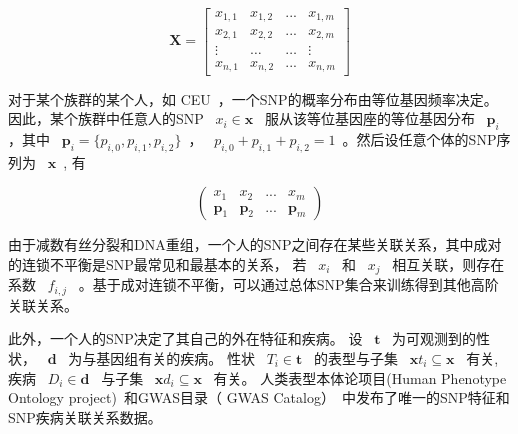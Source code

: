 \begin{equation}
\mathbf{X}=
\left[
\begin{matrix}
x_{1,1} & x_{1,2} & ...    & x_{1,m} \\
x_{2,1} & x_{2,2} & ...    & x_{2,m} \\
\vdots  & \ldots  & \ldots & \vdots  \\
x_{n,1} & x_{n,2} & ...    & x_{n,m}
\end{matrix}
\right]
\end{equation}

对于某个族群的某个人，如 CEU~\cite{auton2015a}，一个SNP的概率分布由等位基因频率决定。  因此，某个族群中任意人的SNP ~$x_i \in \mathbf{x}$~ 服从该等位基因座的等位基因分布 ~$\mathbf{p}_i$~ ，其中 ~$\mathbf{p}_i=\{p_{i,0},p_{i,1}, p_{i,2}\}$~， ~$p_{i,0}+p_{i,1}+p_{i,2}=1$~。然后设任意个体的SNP序列为 ~$\mathbf{x}$~, 有

\begin{equation}
\left(
\begin{matrix}
x_1          & x_2 & ... & x_m \\
\mathbf{p}_1 & \mathbf{p}_2 & ... & \mathbf{p}_m
\end{matrix}
\right)
\end{equation}

由于减数有丝分裂和DNA重组，一个人的SNP之间存在某些关联关系，其中成对的连锁不平衡是SNP最常见和最基本的关系， 若 ~$x_i$~ 和 ~$x_j$~ 相互关联，则存在系数 ~$f_{i,j}$~ 。基于成对连锁不平衡，可以通过总体SNP集合来训练得到其他高阶关联关系。

此外，一个人的SNP决定了其自己的外在特征和疾病。 设 ~$\mathbf{t}$~ 为可观测到的性状， ~$\mathbf{d}$~ 为与基因组有关的疾病。  性状 ~$T_i \in \mathbf{t}$~ 的表型与子集 ~$\mathbf{x}t_i \subseteq \mathbf{x}$~ 有关, 疾病 ~$D_i \in \mathbf{d}$~ 与子集 ~$\mathbf{x}d_i \subseteq \mathbf{x}$~ 有关。 人类表型本体论项目(Human Phenotype Ontology project)~\cite{koehler2014human}和GWAS目录（ GWAS Catalog）~\cite{macarthur2017the}中发布了唯一的SNP特征和SNP疾病关联关系数据。


